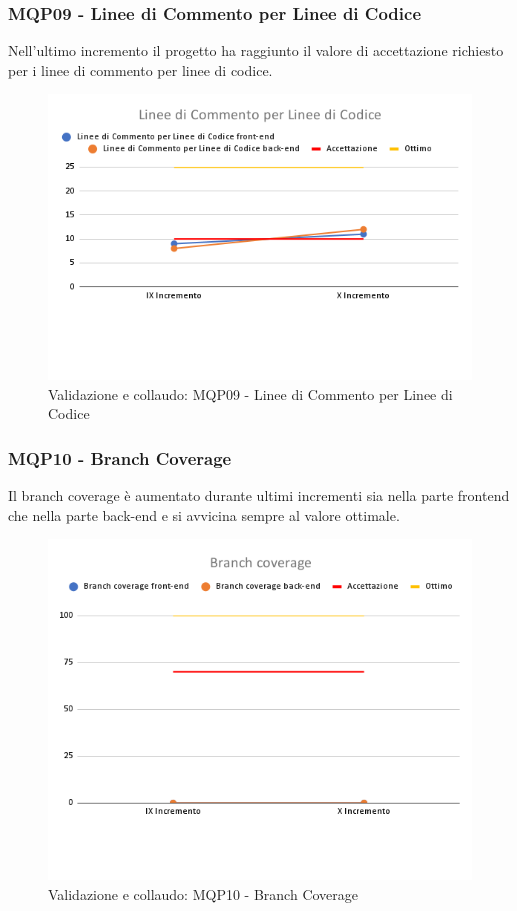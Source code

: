 \subsubsection{MQP09 - Linee di Commento per Linee di Codice}
Nell'ultimo incremento il progetto ha raggiunto il valore di accettazione richiesto per i linee di commento per linee di codice.
\begin{figure}[H]
    \centering
    \includegraphics[scale=0.50]{Sezioni/images/last_prodotto/Linee_di_Commento_per Linee_di_Codice.png}
    \caption{Validazione e collaudo: MQP09 - Linee di Commento per Linee di Codice}
\end{figure}
\subsubsection{MQP10 - Branch Coverage}
Il branch coverage è aumentato durante ultimi incrementi sia nella parte frontend che nella parte back-end e si avvicina sempre al valore ottimale.
\begin{figure}[H]
    \centering
    \includegraphics[scale=0.50]{Sezioni/images/last_prodotto/Branch_coverage.png}
    \caption{Validazione e collaudo: MQP10 - Branch Coverage}
\end{figure}

